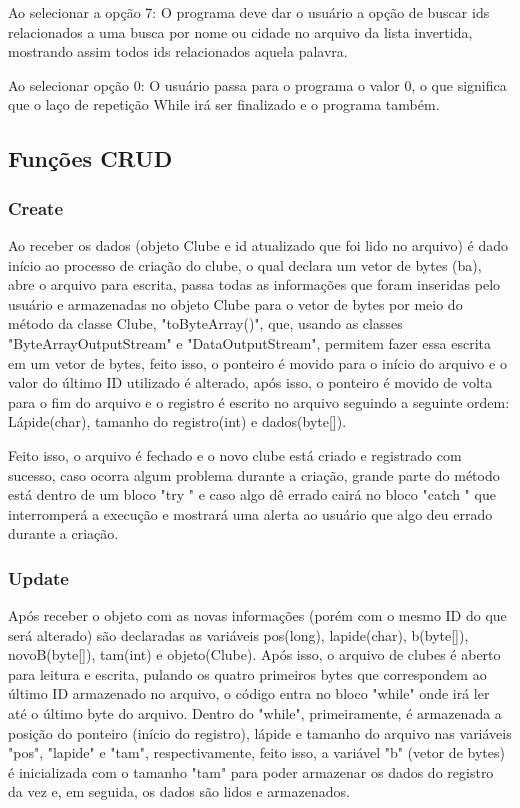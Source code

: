 \documentclass[12pt]{article}
\begin{document}
Ao selecionar a opção 7: O programa deve dar o usuário a opção de buscar ids relacionados a uma busca por nome ou cidade no arquivo da lista invertida, mostrando assim todos ids relacionados aquela palavra.

Ao selecionar opção 0: O usuário passa para o programa o valor 0, o que significa que o laço de repetição While irá ser finalizado e o programa também.

\subsection{Funções CRUD}
\subsubsection{Create}
Ao receber os dados (objeto Clube e id atualizado que foi lido no arquivo) é dado início ao processo de criação do clube, o qual declara um vetor de bytes (ba), abre o arquivo para escrita, passa todas as informações que foram inseridas pelo usuário e armazenadas no objeto Clube para o vetor de bytes por meio do método da classe Clube, "toByteArray()", que,  usando as classes "ByteArrayOutputStream" e "DataOutputStream", permitem fazer essa escrita em um vetor de bytes, feito isso, o ponteiro é movido para o início do arquivo e o valor do último ID utilizado é alterado, após isso, o ponteiro é movido de volta para o fim do arquivo e o registro é escrito no arquivo seguindo a seguinte ordem: Lápide(char), tamanho do registro(int) e dados(byte[]).

Feito isso, o arquivo é fechado e o novo clube está criado e registrado com sucesso, caso ocorra algum problema durante a criação, grande parte do método está dentro de um bloco "try {}" e caso algo dê errado cairá no bloco "catch {}" que interromperá a execução e mostrará uma alerta ao usuário que algo deu errado durante a criação.

\subsubsection{Update}
Após receber o objeto com as novas informações (porém com o mesmo ID do que será alterado) são declaradas as variáveis pos(long), lapide(char), b(byte[]), novoB(byte[]), tam(int) e objeto(Clube). Após isso, o arquivo de clubes é aberto para leitura e escrita, pulando os quatro primeiros bytes que correspondem ao último ID armazenado no arquivo, o código entra no bloco "while{}" onde irá ler até o último byte do arquivo. Dentro do "while", primeiramente, é armazenada a posição do ponteiro (início do registro), lápide e tamanho do arquivo nas variáveis "pos", "lapide" e "tam", respectivamente, feito isso, a variável "b" (vetor de bytes) é inicializada com o tamanho "tam" para poder armazenar os dados do registro da vez e, em seguida, os dados são lidos e armazenados. 
\end{document}
